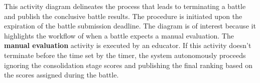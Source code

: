 This activity diagram delineates the process that leads to terminating a battle and publish the conclusive battle results. The procedure is initiated upon the expiration of the battle submission deadline. The diagram is of interest because it highlights the workflow of when a battle expects a manual evaluation. The  \textbf{manual evaluation} activity is executed by an educator. If this activity doesn't terminate before the time set by the timer, the system autonomously proceeds ignoring the consolidation stage scores and publishing the final ranking based on the scores assigned during the battle.